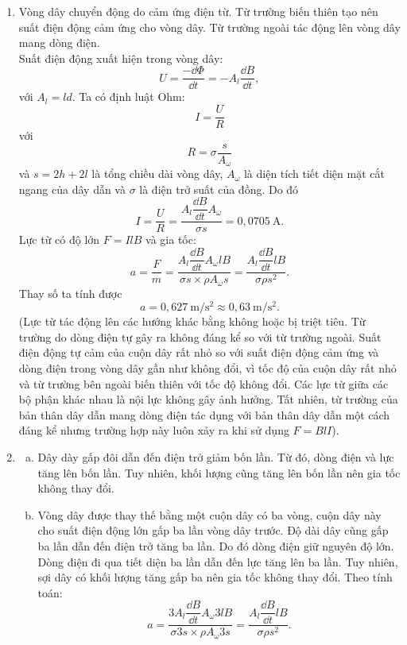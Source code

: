 \begin{loigiai}
\begin{enumerate}[1)]
    \item Vòng dây chuyển động do cảm ứng điện từ. Từ trường biến thiên tạo nên suất điện động cảm ứng cho vòng dây. Từ trường ngoài tác động lên vòng dây mang dòng điện.\\
    Suất điện động xuất hiện trong vòng dây:
    $$U=\dfrac{-\dd\Phi}{\dd t}=-A_l\dfrac{\dd B}{\dd t},$$
    với $A_l=ld$.
    Ta có định luật Ohm: $$I=\dfrac{U}{R}$$
    với $$R=\sigma\dfrac{s}{A_\omega}$$
    và $s=2h+2l$ là tổng chiều dài vòng dây, $A_\omega$ là diện tích tiết diện mặt cắt ngang của dây dẫn và $\sigma$ là điện trở suất của đồng. Do đó 
    $$I=\dfrac{U}{R}=\dfrac{A_l\dfrac{\dd B}{\dd t}A_\omega}{\sigma s}=0,0705~\mathrm{A}.$$
    Lực từ có độ lớn $F=IlB$ và gia tốc:
    $$a=\dfrac{F}{m}=\dfrac{A_l\dfrac{\dd B}{\dd t}A_\omega lB}{\sigma s \times \rho A_\omega s}=\dfrac{A_l\dfrac{\dd B}{\dd t} lB}{\sigma \rho s^2}.$$
    Thay số ta tính được
    $$a= 0,627~\mathrm{m/s^2} \approx 0,63~\mathrm{m/s^2}.$$
    (Lực từ tác động lên các hướng khác bằng không hoặc bị triệt tiêu.
    Từ trường do dòng điện tự gây ra không đáng kể so với từ trường ngoài. Suất điện động tự cảm của cuộn dây rất nhỏ so với suất điện động cảm ứng và dòng điện trong vòng dây gần như không đổi, vì tốc độ của cuộn dây rất nhỏ và từ trường bên ngoài biến thiên với tốc độ không đổi. Các lực từ giữa các bộ phận khác nhau là nội lực không gây ảnh hưởng. Tất nhiên, từ trường của bản thân dây dẫn mang dòng điện tác dụng với bản thân dây dẫn một cách đáng kể nhưng trường hợp này luôn xảy ra khi sử dụng $F=BlI$).
    \item \begin{enumerate}[a)]
        \item Dây dày gấp đôi dẫn đến điện trở giảm bốn lần. Từ đó, dòng điện và lực tăng lên bốn lần. Tuy nhiên, khối lượng cũng tăng lên bốn lần nên gia tốc không thay đổi.
        \item Vòng dây được thay thế bằng một cuộn dây có ba vòng, cuộn dây này cho suất điện động lớn gấp ba lần vòng dây trước. Độ dài dây cũng gấp ba lần dẫn đến điện trở tăng ba lần. Do đó dòng điện giữ nguyên độ lớn.
        \\ Dòng điện đi qua tiết diện ba lần dẫn đến lực tăng lên ba lần. Tuy nhiên, sợi dây có khối lượng tăng gấp ba nên gia tốc không thay đổi.
        Theo tính toán:
        $$a=\dfrac{3A_l\dfrac{\dd B}{\dd t}A_\omega 3lB}{\sigma 3s \times \rho A_\omega 3s}=\dfrac{A_l\dfrac{\dd B}{\dd t} lB}{\sigma \rho s^2}.$$

\end{enumerate}
\end{enumerate}
\end{loigiai}
